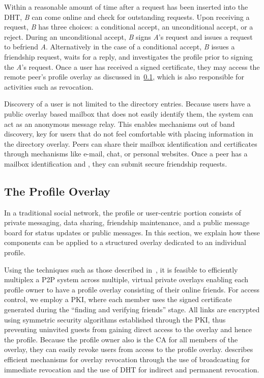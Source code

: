 \documentclass[conference]{IEEEtran}
\begin{document}
Within a reasonable amount of time after a request has been inserted into the
DHT, \textit{B} can come online and check for outstanding requests.  Upon
receiving a request, \textit{B} has three choices: a conditional accept, an
unconditional accept, or a reject.  During an unconditional accept, \textit{B}
signs \textit{A}'s request and issues a request to befriend \textit{A}.
Alternatively in the case of a conditional accept, \textit{B} issues a
friendship request, waits for a reply, and investigates the profile prior to
signing the \textit{A}'s request.  Once a user has received a signed
certificate, they may access the remote peer's profile overlay as discussed
in~\ref{profile_overlay}, which is also responsible for activities such as
revocation.

Discovery of a user is not limited to the directory entries.  Because users
have a public overlay based mailbox that does not easily identify them, the
system can act as an anonymous message relay.  This enables mechanisms out of
band discovery, key for users that do not feel comfortable with placing
information in the directory overlay.  Peers can share their mailbox
identification and certificates through mechanisms like e-mail, chat, or
personal websites.  Once a peer has a mailbox identification and , they can
submit secure friendship requests.

\subsection{The Profile Overlay}
\label{profile_overlay}

In a traditional social network, the profile or user-centric portion consists
of private messaging, data sharing, friendship maintenance, and a public
message board for status updates or public messages.  In this section, we
explain how these components can be applied to a structured overlay dedicated
to an individual profile.

Using the techniques such as those described in~\cite{vpo}, it is feasible to
efficiently multiplex a P2P system across multiple, virtual private overlays
enabling each profile owner to have a profile overlay consisting of their
online friends.  For access control, we employ a PKI, where each member uses
the signed certificate generated during the ``finding and verifying friends''
stage.  All links are encrypted using symmetric security algorithms established
through the PKI, thus preventing uninvited guests from gaining direct access to
the overlay and hence the profile.  Because the profile owner also is the CA
for all members of the overlay, they can easily revoke users from access to the
profile overlay.  \cite{vpo} describes efficient mechanisms for overlay
revocation through the use of broadcasting for immediate revocation and the use
of DHT for indirect and permanent revocation.
\end{document}
